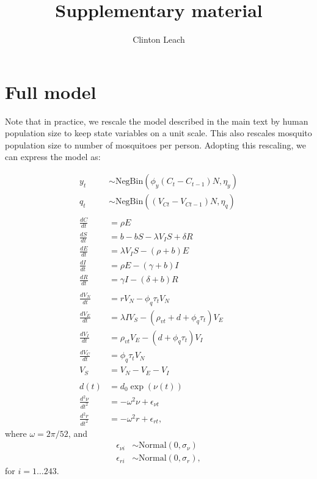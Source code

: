 \documentclass[12pt,letterpaper]{article}
\title{Supplementary material}
\author{Clinton Leach}
\begin{document}
\maketitle


\section*{Full model}

Note that in practice, we rescale the model described in the main text by human population size to keep state variables on a unit scale.
This also rescales mosquito population size to number of mosquitoes per person.
Adopting this rescaling, we can express the model as:

\begin{align}
y_t & \sim \text{NegBin}(\phi_y  (C_t - C_{t-1})N, \eta_y)\\
q_t & \sim \text{NegBin}((V_{Ct} - V_{Ct-1})N, \eta_q)\\
\\
\frac{dC}{dt} &= \rho E \\
\frac{dS}{dt} &= b - bS - \lambda V_{I}S + \delta R\\
\frac{dE}{dt} &= \lambda V_{I}S - (\rho + b)E\\
\frac{dI}{dt} &= \rho E - (\gamma + b)I\\
\frac{dR}{dt} &= \gamma I - (\delta + b)R\\
\\
\frac{dV_N}{dt} & = r V_N - \phi_q \tau_t V_N\\
\frac{dV_E}{dt} &= \lambda IV_S - (\rho_{vt} + d + \phi_q \tau_t)V_E\\
\frac{dV_I}{dt} &= \rho_{vt} V_E - (d + \phi_q \tau_t) V_I\\
\frac{dV_C}{dt} & = \phi_q \tau_t V_N\\
V_S &= V_N - V_E - V_I\\
\\
d(t) &= d_0 \exp(\nu(t))\\
\frac{d^2\nu}{dt^2} &= -\omega^2 \nu + \epsilon_{\nu t}\\
\frac{d^2 r}{dt^2} &= -\omega^2 r + \epsilon_{rt},
\end{align}
where $\omega = 2\pi / 52$, and
\begin{align}
\epsilon_{\nu i} & \sim \text{Normal}(0, \sigma_{\nu})\\
\epsilon_{ri} & \sim \text{Normal}(0, \sigma_r),
\end{align}
for $i = 1 \dots 243$.
\end{document}
